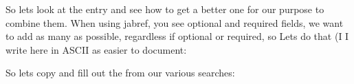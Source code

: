 So lets look at the entry and see how to get a better one for our
purpose to combine them. When using jabref, you see optional and
required fields, we want to add as many as possible, regardless if
optional or required, so Lets do that (I I write here in ASCII as
easier to document:

\begin{sphinxVerbatim}[commandchars=\\\{\}]
      
       
     
      
    
             
           
           
           
           
            
            
          
    
    
             
           
\end{sphinxVerbatim}

So lets copy and fill out the  from our various searches:

